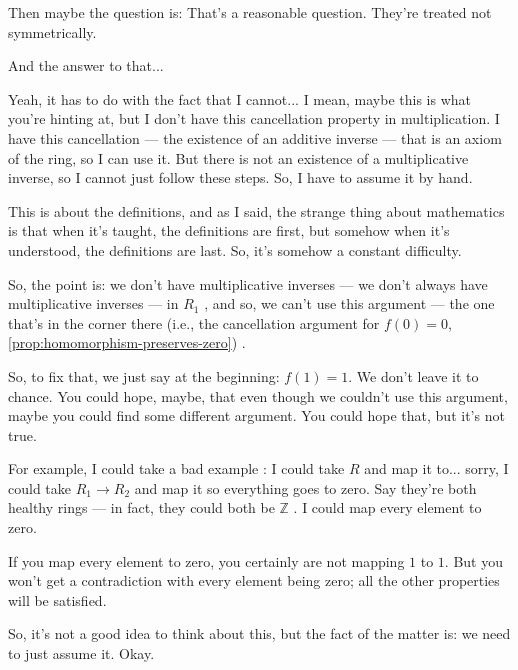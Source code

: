 \begin{speech}[00:22:25 - 00:24:16]
Then maybe the question is:  That's a reasonable question. They're treated not symmetrically.

And the answer to that... 

Yeah, it has to do with the fact that I cannot... I mean, maybe this is what you're hinting at, but I don't have this cancellation property in multiplication. I have this cancellation --- the existence of an additive inverse --- that is an axiom of the ring, so I can use it. But there is not an existence of a multiplicative inverse, so I cannot just follow these steps. So, I have to assume it by hand.

This is about the definitions, and as I said, the strange thing about mathematics is that when it's taught, the definitions are first, but somehow when it's understood, the definitions are last. So, it's somehow a constant difficulty. 

So, the point is: we don't have  multiplicative inverses  --- we don't always have multiplicative inverses --- in $R_1$ , and so, we can't  use this argument  --- the one that's in the corner there (i.e., the cancellation argument for $f(0) = 0$, \cref{prop:homomorphism-preserves-zero}) .

So, to fix that, we just say at the beginning: $f(1) = 1$. We don't leave it to chance. You could hope, maybe, that even though we couldn't use this argument, maybe you could find some different argument. You could hope that, but it's not true.
\end{speech}

\begin{speech}[00:24:16 - 00:25:08]
For example, I could take a bad example : I could take $R$ and map it to... sorry, I could take $R_1 \to R_2$  and map it so everything goes to zero. Say they're both healthy rings --- in fact, they could both be $\mathbb{Z}$ . I could map every element to zero.

If you map every element to zero, you certainly are not mapping $1$ to $1$. But you won't get a contradiction with every element being zero; all the other properties will be satisfied.

So, it's not a good idea to think about this, but the fact of the matter is: we need to just assume it.  Okay.
\end{speech}

